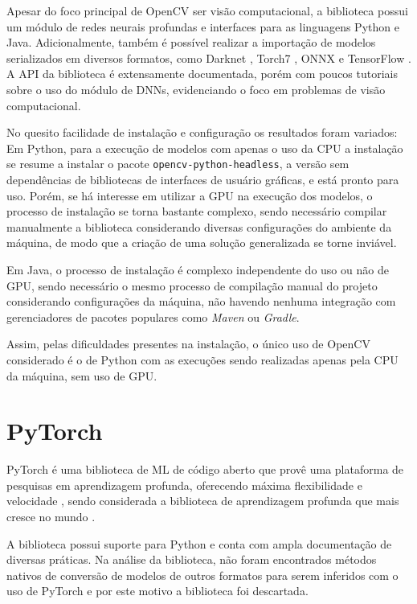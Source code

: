 Apesar do foco principal de OpenCV ser visão computacional, a biblioteca possui um módulo de redes neurais profundas e interfaces para as linguagens Python e Java. Adicionalmente, também é possível realizar a importação de modelos serializados em diversos formatos, como Darknet \cite{ml_site_darknet}, Torch7 \cite{ml_site_torch}, ONNX \cite{ml_site_onnx} e TensorFlow \cite{ml_site_tensorflow}. A \acrshort{API} da biblioteca é extensamente documentada, porém com poucos tutoriais sobre o uso do módulo de DNNs, evidenciando o foco em problemas de visão computacional.

No quesito facilidade de instalação e configuração os resultados foram variados: Em Python, para a execução de modelos com apenas o uso da CPU a instalação se resume a instalar o pacote \texttt{opencv-python-headless}, a versão sem dependências de bibliotecas de interfaces de usuário gráficas, e está pronto para uso. Porém, se há interesse em utilizar a GPU na execução dos modelos, o processo de instalação se torna bastante complexo, sendo necessário compilar manualmente a biblioteca considerando diversas configurações do ambiente da máquina, de modo que a criação de uma solução generalizada se torne inviável.

Em Java, o processo de instalação é complexo independente do uso ou não de GPU, sendo necessário o mesmo processo de compilação manual do projeto considerando configurações da máquina, não havendo nenhuma integração com gerenciadores de pacotes populares como \textit{Maven} ou \textit{Gradle}.

Assim, pelas dificuldades presentes na instalação, o único uso de OpenCV considerado é o de Python com as execuções sendo realizadas apenas pela CPU da máquina, sem uso de GPU.

\section{PyTorch}

PyTorch é uma biblioteca de ML de código aberto que provê uma plataforma de pesquisas em aprendizagem profunda, oferecendo máxima flexibilidade e velocidade \cite{pytorch_what_is}, sendo considerada a biblioteca de aprendizagem profunda que mais cresce no mundo \cite{course_fast_ai}.

A biblioteca possui suporte para Python e conta com ampla documentação de diversas práticas. Na análise da biblioteca, não foram encontrados métodos nativos de conversão de modelos de outros formatos para serem inferidos com o uso de PyTorch e por este motivo a biblioteca foi descartada.

